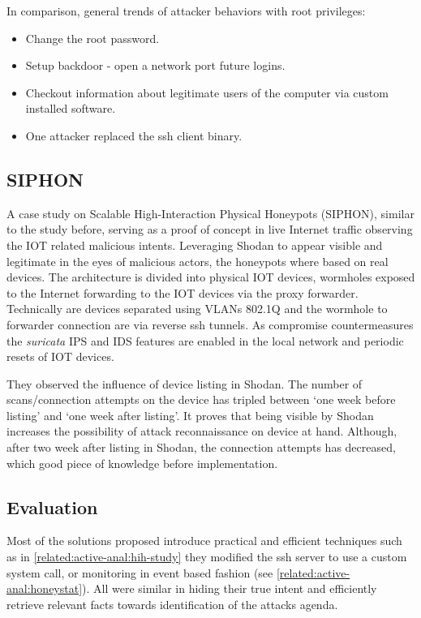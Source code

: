 In comparison, general trends of attacker behaviors with root privileges:
	
\begin{itemize}[noitemsep]
	\item Change the root password.
	\item Setup backdoor - open a network port future logins.
	\item Checkout information about legitimate users of the computer via custom installed software.
	\item One attacker replaced the ssh client binary.
\end{itemize}

\subsection{SIPHON \label{related:active-anal:siphon}}
A case study \cite{study:siphon} on Scalable High-Interaction Physical Honeypots (SIPHON), similar to the study before, serving as a proof of concept in live Internet traffic observing the IOT related malicious intents. Leveraging Shodan to appear visible and legitimate in the eyes of malicious actors, the honeypots where based on real devices. The architecture is divided into physical IOT devices, wormholes exposed to the Internet forwarding to the IOT devices via the proxy forwarder. Technically are devices separated using VLANs 802.1Q and the wormhole to forwarder connection are via reverse ssh tunnels. As compromise countermeasures the \textit{suricata} IPS and IDS features are enabled in the local network and periodic resets of IOT devices.

They observed the influence of device listing in Shodan. The number of scans/connection attempts on the device has tripled between `one week before listing' and `one week after listing'. It proves that being visible by Shodan increases the possibility of attack reconnaissance on device at hand. Although, after two week after listing in Shodan, the connection attempts has decreased, which good piece of knowledge before implementation.

\subsection{Evaluation}
Most of the solutions proposed introduce practical and efficient techniques such as in \autoref{related:active-anal:hih-study} they modified the ssh server to use a custom system call, or monitoring in event based fashion (see \autoref{related:active-anal:honeystat}). All were similar in hiding their true intent and efficiently retrieve relevant facts towards identification of the attacks agenda.

